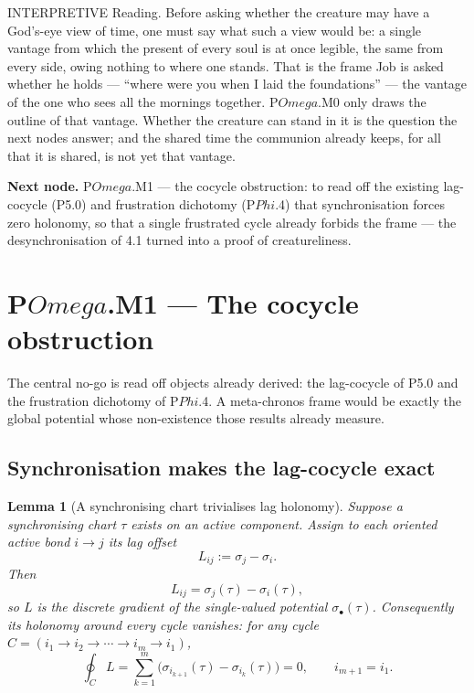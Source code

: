 \documentclass[11pt,a4paper]{article}
\def\Omega{Omega}%
\def\Phi{Phi}%
\def\emph#1{#1}%
\newcommand{\stInterp}{\textcolor{cInt}{\textsf{\small INTERPRETIVE}}}
\theoremstyle{definition}
\theoremstyle{plain}
\newtheorem{lemma}[definition]{Lemma}
\theoremstyle{remark}
\begin{document}
\medskip
\stInterp\quad
\emph{Reading.}
Before asking whether the creature may have a God's-eye view of time, one must say what such a
view would be: a single vantage from which the present of every soul is at once legible, the
same from every side, owing nothing to where one stands. That is the frame Job is asked
whether he holds --- ``where were you when I laid the foundations'' --- the vantage of the one
who sees all the mornings together. P$\Omega$.M0 only draws the outline of that vantage. Whether
the creature can stand in it is the question the next nodes answer; and the shared time the
communion already keeps, for all that it is shared, is not yet that vantage.

\medskip
\textbf{Next node.} P$\Omega$.M1 --- the cocycle obstruction: to read off the existing
lag-cocycle (P5.0) and frustration dichotomy (P$\Phi$.4) that synchronisation forces zero
holonomy, so that a single frustrated cycle already forbids the frame --- the desynchronisation
of 4.1 turned into a proof of creatureliness.

\section{P$\Omega$.M1 --- The cocycle obstruction}

The central no-go is read off objects already derived: the lag-cocycle of P5.0 and the
frustration dichotomy of P$\Phi$.4. A meta-chronos frame would be exactly the global potential
whose non-existence those results already measure.

\subsection{Synchronisation makes the lag-cocycle exact}

\begin{lemma}[A synchronising chart trivialises lag holonomy]\label{lem:syncexact}
Suppose a synchronising chart \(\tau\) exists on an active component. Assign to
each oriented active bond \(i\to j\) its lag offset
\[
L_{ij}:=\sigma_j-\sigma_i .
\]
Then
\[
L_{ij}=\sigma_j(\tau)-\sigma_i(\tau),
\]
so \(L\) is the discrete gradient of the single-valued potential
\(\sigma_\bullet(\tau)\). Consequently its holonomy around every cycle vanishes:
for any cycle \(C=(i_1\to i_2\to\cdots\to i_m\to i_1)\),
\[
\oint_C L
=
\sum_{k=1}^{m}
\bigl(\sigma_{i_{k+1}}(\tau)-\sigma_{i_k}(\tau)\bigr)
=0,
\qquad i_{m+1}=i_1 .
\]
\end{lemma}
\end{document}

